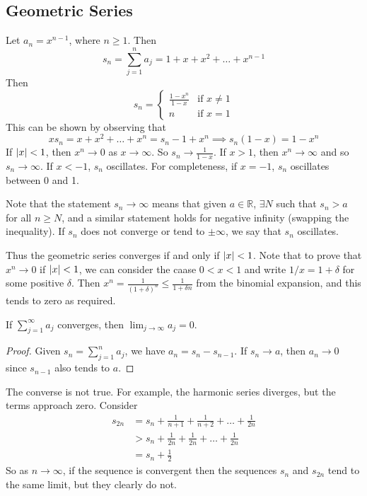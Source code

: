\subsection{Geometric Series}
Let \(a_n = x^{n-1}\), where \(n \geq 1\).
Then
\[
	s_n = \sum_{j=1}^n a_j = 1 + x + x^2 + \dots + x^{n-1}
\]
Then
\[
	s_n = \begin{cases}
		\frac{1 - x^n}{1 - x} & \text{if } x \neq 1 \\
		n                     & \text{if } x = 1
	\end{cases}
\]
This can be shown by observing that
\[
	x s_n = x + x^2 + \dots + x^n = s_n - 1 + x^n \implies s_n(1-x) = 1-x^n
\]
If \(\abs{x} < 1\), then \(x^n \to 0\) as \(x \to \infty\).
So \(s_n \to \frac{1}{1-x}\).
If \(x > 1\), then \(x^n \to \infty\) and so \(s_n \to \infty\).
If \(x < -1\), \(s_n\) oscillates.
For completeness, if \(x=-1\), \(s_n\) oscillates between 0 and 1.

Note that the statement \(s_n \to \infty\) means that given \(a \in \mathbb R\), \(\exists N\) such that \(s_n > a\) for all \(n \geq N\), and a similar statement holds for negative infinity (swapping the inequality).
If \(s_n\) does not converge or tend to \(\pm \infty\), we say that \(s_n\) oscillates.

Thus the geometric series converges if and only if \(\abs{x} < 1\).
Note that to prove that \(x^n \to 0\) if \(\abs{x} < 1\), we can consider the caase \(0 < x < 1\) and write \(1/x = 1 + \delta\) for some positive \(\delta\).
Then \(x^n = \frac{1}{(1 + \delta)^n} \leq \frac{1}{1 + \delta n}\) from the binomial expansion, and this tends to zero as required.

\begin{lemma}
	If \(\sum_{j=1}^\infty a_j\) converges, then \(\lim_{j \to \infty} a_j = 0\).
\end{lemma}
\begin{proof}
	Given \(s_n = \sum_{j=1}^n a_j\), we have \(a_n = s_n - s_{n-1}\).
	If \(s_n \to a\), then \(a_n \to 0\) since \(s_{n-1}\) also tends to \(a\).
\end{proof}
\begin{remark}
	The converse is not true.
	For example, the harmonic series diverges, but the terms approach zero.
	Consider
	\begin{align*}
		s_{2n} & = s_n + \frac{1}{n+1} + \frac{1}{n+2} + \dots + \frac{1}{2n} \\
		       & > s_n + \frac{1}{2n} + \frac{1}{2n} + \dots + \frac{1}{2n}   \\
		       & = s_n + \frac{1}{2}
	\end{align*}
	So as \(n \to \infty\), if the sequence is convergent then the sequences \(s_n\) and \(s_{2n}\) tend to the same limit, but they clearly do not.
\end{remark}

